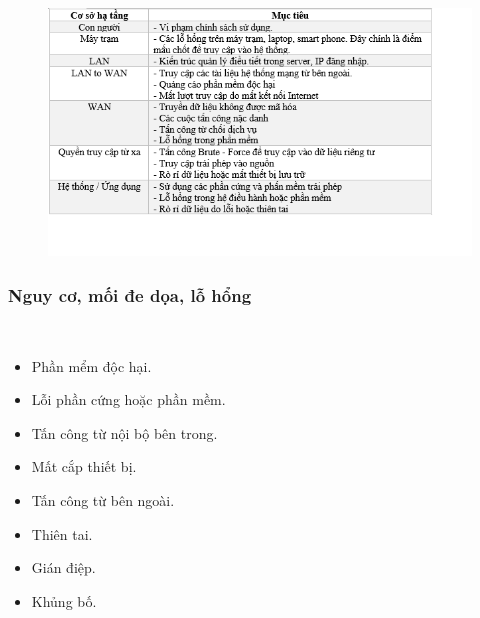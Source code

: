 \documentclass{beamer}
\begin{document}
\begin{frame}
\begin{figure}[h]
\centering\includegraphics[width=1\linewidth]{images/pic1.png}
\end{figure}
\end{frame}


\begin{frame}
\frametitle{Nguy cơ, mối đe dọa, lỗ hổng}
\\
\begin{itemize}
\item Phần mểm độc hại.
\item Lỗi phần cứng hoặc phần mềm.
\item Tấn công từ nội bộ bên trong.
\item Mất cắp thiết bị.
\item Tấn công từ bên ngoài.
\item Thiên tai.
\item Gián điệp.
\item Khủng bố.

\end{itemize}
\end{frame}

\end{document}
